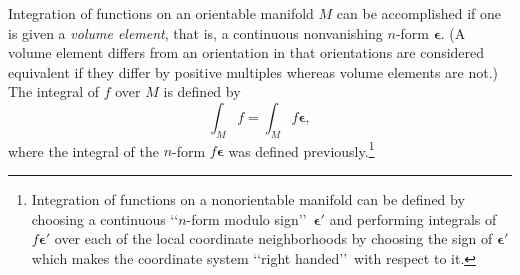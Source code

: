 Integration of functions on an orientable manifold \(M\) can be accomplished if one
is given a \emph{volume element}, that is, a continuous nonvanishing
\(n\)-form \(\boldsymbol\epsilon\). (A volume element differs from an orientation in
that orientations are considered equivalent if they differ by positive multiples
whereas volume elements are not.) The integral of \(f\) over \(M\) is defined by
\begin{equation}
  \int_M f=\int_M f\boldsymbol\epsilon,
  \tag{B.2.8}\label{eq:B.2.8}
\end{equation}
where the integral of the \(n\)-form \(f\boldsymbol\epsilon\) was defined
previously.\footnote{Integration of functions on a nonorientable manifold can be
defined by choosing a continuous \lq\lq \(n\)-form modulo sign\rq\rq\
\(\boldsymbol\epsilon'\) and performing integrals of \(f\boldsymbol\epsilon'\) over
each of the local coordinate neighborhoods by choosing the sign of
\(\boldsymbol\epsilon'\) which makes the coordinate system \lq\lq right handed\rq\rq\
with respect to it.}

